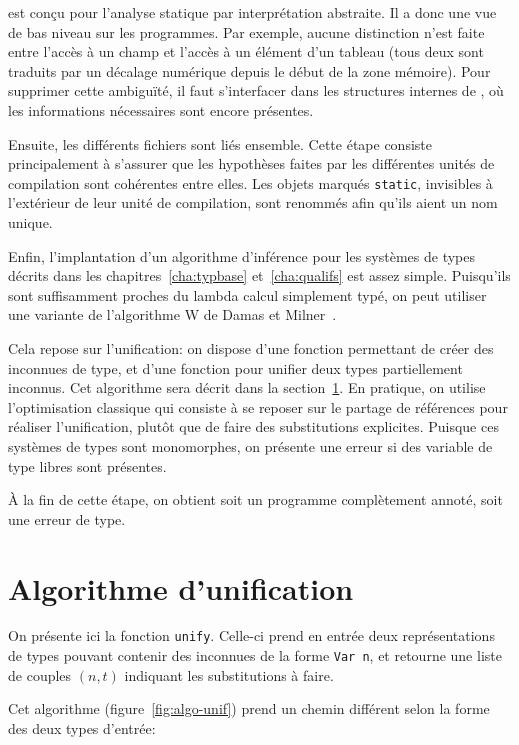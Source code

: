 \newspeak est conçu pour l'analyse statique par interprétation abstraite. Il a
donc une vue de bas niveau sur les programmes. Par exemple, aucune distinction
n'est faite entre l'accès à un champ et l'accès à un élément d'un tableau (tous
deux sont traduits par un décalage numérique depuis le début de la zone
mémoire). Pour supprimer cette ambiguïté, il faut s'interfacer dans les
structures internes de \ctonewspeak, où les informations nécessaires sont encore
présentes.

Ensuite, les différents fichiers sont liés ensemble. Cette étape consiste
principalement à s'assurer que les hypothèses faites par les différentes unités
de compilation sont cohérentes entre elles. Les objets marqués \texttt{static},
invisibles à l'extérieur de leur unité de compilation, sont renommés afin qu'ils
aient un nom unique.

Enfin, l'implantation d'un algorithme d'inférence pour les systèmes de types
décrits dans les chapitres~\ref{cha:typbase} et~\ref{cha:qualifs} est assez
simple. Puisqu'ils sont suffisamment proches du lambda calcul simplement typé, on
peut utiliser une variante de l'algorithme W de Damas et
Milner~\cite{DamasMilner}.

Cela repose sur l'unification: on dispose d'une fonction permettant de créer des
inconnues de type, et d'une fonction pour unifier deux types partiellement
inconnus. Cet algorithme sera décrit dans la section~\ref{sec:unif}. En
pratique, on utilise l'optimisation classique qui consiste à se
reposer sur le partage de références pour réaliser l'unification, plutôt que de
faire des substitutions explicites. Puisque ces systèmes de types sont
monomorphes, on présente une erreur si des variable de type libres sont
présentes.

À la fin de cette étape, on obtient soit un programme complètement annoté, soit
une erreur de type.

\section{Algorithme d'unification}
\label{sec:unif}

On présente ici la fonction \texttt{unify}. Celle-ci prend en entrée deux
représentations de types pouvant contenir des inconnues de la forme \texttt{Var
n}, et retourne une liste de couples $(n, t)$ indiquant les substitutions à
faire.

Cet algorithme (figure~\ref{fig:algo-unif}) prend un chemin différent selon la
forme des deux types d'entrée:

